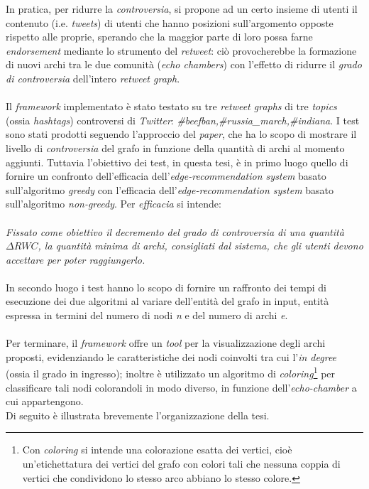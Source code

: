 In pratica, per ridurre la \textit{controversia}, si propone ad un certo insieme di utenti il contenuto (i.e. \textit{tweets}) di utenti che hanno posizioni sull'argomento opposte rispetto alle proprie, sperando che la maggior parte di loro possa farne \textit{endorsement} mediante lo strumento del \textit{retweet}: ciò provocherebbe la formazione di nuovi archi tra le due comunità (\textit{echo chambers}) con l'effetto di ridurre il \textit{grado di controversia} dell'intero \textit{retweet graph}.  
\\\\Il \textit{framework} implementato è stato testato su tre \textit{retweet graphs} di tre \textit{topics} (ossia \textit{hashtags}) controversi di \textit{Twitter}: \textit{\#beefban,\#russia\_march,\#indiana}. I test sono stati prodotti seguendo l'approccio del \textit{paper}\cite{garimella:paper}, che ha lo scopo di mostrare il livello di \textit{controversia} del grafo in funzione della quantità di archi al momento aggiunti. Tuttavia l'obiettivo dei test, in questa tesi, è in primo luogo quello di fornire un confronto dell'efficacia dell'\textit{edge-recommendation system} basato sull'algoritmo \textit{greedy} con l'efficacia dell'\textit{edge-recommendation system} basato sull'algoritmo \textit{non-greedy}. Per \textit{efficacia} si intende:
\\\\
\textit{Fissato come obiettivo il decremento del grado di controversia di una quantità $\Delta RWC$, la quantità minima di archi, consigliati dal sistema, che gli utenti devono accettare per poter raggiungerlo.}
\\\\
In secondo luogo i test hanno lo scopo di fornire un raffronto dei tempi di esecuzione dei due algoritmi al variare dell'entità del grafo in input, entità espressa in termini del numero di nodi \textit{n} e del numero di archi \textit{e}.
\\\\Per terminare, il \textit{framework} offre un \textit{tool} per la visualizzazione degli archi proposti, evidenziando le caratteristiche dei nodi coinvolti tra cui l'\textit{in degree} (ossia il grado in ingresso); inoltre è utilizzato un algoritmo di \textit{coloring}\footnote{Con \textit{coloring} si intende una colorazione esatta dei vertici, cioè un'etichettatura dei vertici del grafo con colori tali che nessuna coppia di vertici che condividono lo stesso arco abbiano lo stesso colore.} per classificare tali nodi colorandoli in modo diverso, in funzione dell'\textit{echo-chamber} a cui appartengono.
\\Di seguito è illustrata brevemente l'organizzazione della tesi.
